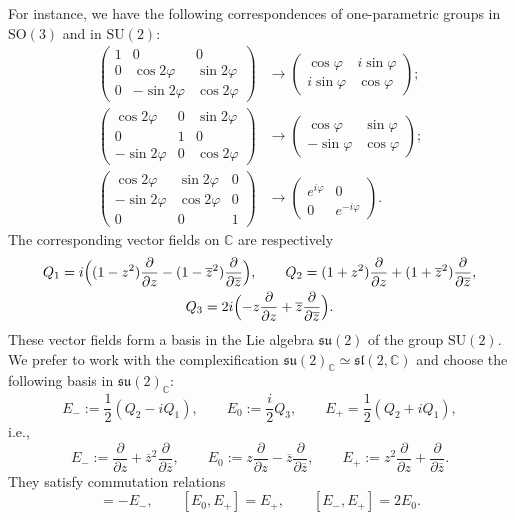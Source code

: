 \documentclass[]{amsart}
\def\SU{\mathrm {SU}}
\def\SO{\mathrm  {SO}}
\def\phi{\varphi}
\def\C {{\mathbb C }}
\def\ov{\overline}
\begin{document}
For instance, we  have the following correspondences of 
one-parametric groups in $\SO(3)$ and in $\SU(2)$:
\begin{align*}
\begin{pmatrix}1&0&0\\
0&\cos 2\phi&\sin2\phi\\
0&-\sin 2\phi&\cos 2\phi
\end{pmatrix}&\longrightarrow
\begin{pmatrix}
\cos\phi& i \sin\phi
\\
i \sin\phi&\cos\phi
\end{pmatrix};
\\
\begin{pmatrix}
\cos2\phi&0&\sin 2\phi\\
0&1&0\\
-\sin 2\phi&0&\cos 2\phi
\end{pmatrix}&
\longrightarrow
\begin{pmatrix}
\cos \phi&\sin\phi\\
-\sin\phi&\cos\phi
\end{pmatrix};
\\
\begin{pmatrix}
\cos 2\phi&\sin 2\phi&0\\
-\sin 2\phi&\cos 2\phi&0\\
0&0&1
\end{pmatrix}
&
\longrightarrow
\begin{pmatrix}
e^{i\phi}&0\\
0&e^{-i\phi}
\end{pmatrix}.
\end{align*}
The corresponding vector fields on $\C$ are
respectively
\begin{gather*}
Q_1=i\Bigl((1-z^2)\frac{\partial}{\partial z}-
(1-\ov z^2)\frac{\partial}{\partial \ov z}\Bigr)
,\qquad
Q_2=(1+z^2)\frac{\partial}{\partial z}+
 (1+\ov z^2)\frac{\partial}{\partial \ov z},\\
Q_3= 2i\Bigl(-z \frac{\partial}{\partial z}+
 \ov z \frac{\partial}{\partial\ov z}\Bigr).
\end{gather*}
These vector fields form a basis in the Lie algebra $\mathfrak{su}(2)$
of the group $\SU(2)$. We prefer to work with the complexification
$\mathfrak{su}(2)_\C\simeq \mathfrak{sl}(2,\C)$ and choose the following basis
in $\mathfrak{su}(2)_\C$:
$$
E_-:=\frac12(Q_2-i Q_1),\qquad E_0:=\frac i2 Q_3,\qquad 
E_+=\frac12(Q_2+i Q_1),
$$
i.e.,
\begin{equation}
E_-:=\frac{\partial}{\partial z}+\ov z^2 \frac{\partial}{\partial \ov z},
\qquad 
E_0:=z\frac{\partial}{\partial z}-\ov z\frac{\partial}{\partial \ov z},\qquad
E_+:=z^2\frac{\partial}{\partial z}+\frac{\partial}{\partial \ov z}.
\label{eq:basis-E}
\end{equation}
They satisfy commutation relations
\begin{equation}
[E_0,E_-]=-E_-,\qquad [E_0,E_+]=E_+,\qquad [E_-,E_+]=2E_0.
\end{equation}
\end{document}

